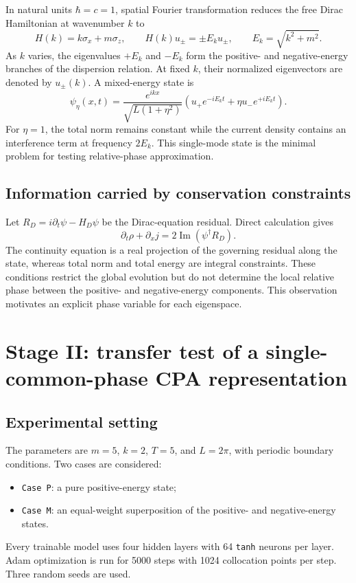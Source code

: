 \documentclass[a4paper,11pt]{article}
\begin{document}
In natural units \(\hbar=c=1\), spatial Fourier transformation reduces the free
Dirac Hamiltonian at wavenumber \(k\) to
\begin{equation}
H(k)=k\sigma_x+m\sigma_z,
\qquad
H(k)u_\pm=\pm E_k u_\pm,
\qquad
E_k=\sqrt{k^2+m^2}.
\end{equation}
As \(k\) varies, the eigenvalues \(+E_k\) and \(-E_k\) form the positive- and
negative-energy branches of the dispersion relation. At fixed \(k\), their
normalized eigenvectors are denoted by \(u_\pm(k)\). A mixed-energy state is
\begin{equation}
\psi_\eta(x,t)=
\frac{e^{ikx}}{\sqrt{L(1+\eta^2)}}
\left(u_+e^{-iE_kt}+\eta u_-e^{+iE_kt}\right).
\end{equation}
For \(\eta=1\), the total norm remains constant while the current density
contains an interference term at frequency \(2E_k\). This single-mode state is
the minimal problem for testing relative-phase approximation.

\subsection{Information carried by conservation constraints}

Let \(R_D=i\partial_t\psi-H_D\psi\) be the Dirac-equation residual. Direct
calculation gives
\begin{equation}
\partial_t\rho+\partial_xj
=2\operatorname{Im}(\psi^\dagger R_D).
\end{equation}
The continuity equation is a real projection of the governing residual along
the state, whereas total norm and total energy are integral constraints. These
conditions restrict the global evolution but do not determine the local
relative phase between the positive- and negative-energy components. This
observation motivates an explicit phase variable for each eigenspace.

\section{Stage II: transfer test of a single-common-phase CPA representation}

\subsection{Experimental setting}

The parameters are \(m=5\), \(k=2\), \(T=5\), and \(L=2\pi\), with periodic
boundary conditions. Two cases are considered:
\begin{itemize}
  \item \texttt{Case P}: a pure positive-energy state;
  \item \texttt{Case M}: an equal-weight superposition of the positive- and
  negative-energy states.
\end{itemize}
Every trainable model uses four hidden layers with 64 \texttt{tanh} neurons per
layer. Adam optimization is run for 5000 steps with 1024 collocation points per
step. Three random seeds are used.
\end{document}
